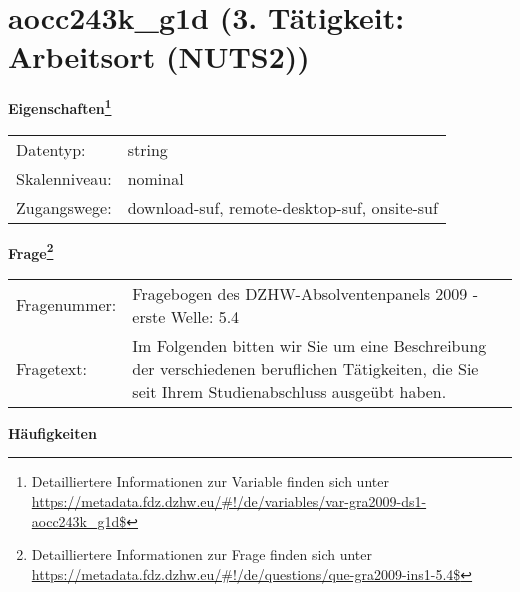 
    \setcounter{footnote}{0}

    \vspace*{-1.8cm}
	\section{aocc243k\_g1d (3. Tätigkeit: Arbeitsort (NUTS2))}
	\label{section:aocc243k_g1d}



    \vspace*{0.5cm}
    \noindent\textbf{Eigenschaften\footnote{Detailliertere Informationen zur Variable finden sich unter
		\url{https://metadata.fdz.dzhw.eu/\#!/de/variables/var-gra2009-ds1-aocc243k_g1d$}}}\\
	\begin{tabularx}{\hsize}{@{}lX}
	Datentyp: & string \\
	Skalenniveau: & nominal \\
	Zugangswege: &
	  download-suf, 
	  remote-desktop-suf, 
	  onsite-suf
 \\
    \end{tabularx}



				\vspace*{0.5cm}
                \noindent\textbf{Frage\footnote{Detailliertere Informationen zur Frage finden sich unter
		              \url{https://metadata.fdz.dzhw.eu/\#!/de/questions/que-gra2009-ins1-5.4$}}}\\
				\begin{tabularx}{\hsize}{@{}lX}
					Fragenummer: &
					  Fragebogen des DZHW-Absolventenpanels 2009 - erste Welle:
					  5.4
 \\
					Fragetext: & Im Folgenden bitten wir Sie um eine Beschreibung der verschiedenen beruflichen Tätigkeiten, die Sie seit Ihrem Studienabschluss ausgeübt haben. \\
				\end{tabularx}





        		\vspace*{0.5cm}
                \noindent\textbf{Häufigkeiten}

